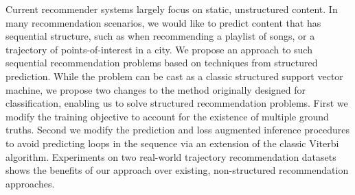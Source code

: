 Current recommender systems largely focus on static, unstructured content.
In many recommendation scenarios, we would like to predict content that has sequential structure,
such as when recommending a playlist of songs, or a trajectory of points-of-interest in a city.
We propose an approach to such sequential recommendation problems based on techniques from structured prediction.
While the problem can be cast as a classic structured support vector machine,
we propose two changes to the method originally designed for classification,
enabling us to solve structured recommendation problems.
First we modify the training objective to account for the existence of multiple ground truths.
Second we modify the prediction and loss augmented inference procedures to avoid predicting loops in the sequence via an extension of the classic Viterbi algorithm.
Experiments on two real-world trajectory recommendation datasets shows the benefits of our approach over existing, non-structured recommendation approaches.
